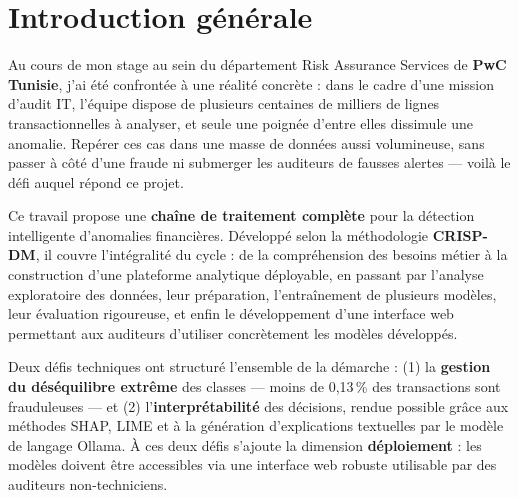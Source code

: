 \documentclass[12pt,a4paper,twoside]{report}
\begin{document}
\newpage


\chapter*{Introduction générale}

Au cours de mon stage au sein du département Risk Assurance Services de \textbf{PwC Tunisie}, j'ai été confrontée à une réalité concrète : dans le cadre d'une mission d'audit IT, l'équipe dispose de plusieurs centaines de milliers de lignes transactionnelles à analyser, et seule une poignée d'entre elles dissimule une anomalie. Repérer ces cas dans une masse de données aussi volumineuse, sans passer à côté d'une fraude ni submerger les auditeurs de fausses alertes --- voilà le défi auquel répond ce projet.

Ce travail propose une \textbf{chaîne de traitement complète} pour la détection intelligente d'anomalies financières. Développé selon la méthodologie \textbf{CRISP-DM}, il couvre l'intégralité du cycle : de la compréhension des besoins métier à la construction d'une plateforme analytique déployable, en passant par l'analyse exploratoire des données, leur préparation, l'entraînement de plusieurs modèles, leur évaluation rigoureuse, et enfin le développement d'une interface web permettant aux auditeurs d'utiliser concrètement les modèles développés.

Deux défis techniques ont structuré l'ensemble de la démarche : (1) la \textbf{gestion du déséquilibre extrême} des classes --- moins de 0,13\,\% des transactions sont frauduleuses --- et (2) l'\textbf{interprétabilité} des décisions, rendue possible grâce aux méthodes SHAP, LIME et à la génération d'explications textuelles par le modèle de langage Ollama. À ces deux défis s'ajoute la dimension \textbf{déploiement} : les modèles doivent être accessibles via une interface web robuste utilisable par des auditeurs non-techniciens.
\end{document}
